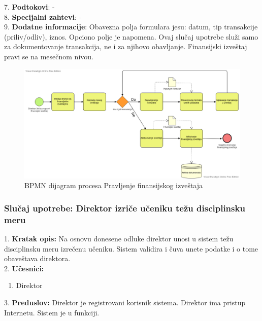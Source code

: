 \documentclass{article}
\begin{document}
7. \textbf{Podtokovi}:  - \\

8. \textbf{Specijalni zahtevi}: - \\

9. \textbf{Dodatne informacije}: Obavezna polja formulara jesu: datum, tip transakcije (priliv/odliv), iznos. Opciono polje je napomena. Ovaj slučaj upotrebe služi samo za dokumentovanje transakcija, ne i za njihovo obavljanje. Finansijski izveštaj pravi se na mesečnom nivou.  \\

\begin{figure} [!ht]
    \begin{center}
        \includegraphics[scale=0.37]{imgs/BPMN_pravljenje_finansijskog_izvestaja.png}
    \end{center}
\caption{BPMN dijagram procesa Pravljenje finansijskog izveštaja}
\end{figure}


\subsubsection{Slučaj upotrebe: Direktor izriče učeniku težu disciplinsku meru}
1. \textbf{Kratak opis:} Na osnovu donesene odluke direktor unosi u sistem težu disciplinsku meru izrečenu učeniku. Sistem validira i čuva unete podatke i o tome obaveštava direktora. \\

2. \textbf{Učesnici:}
\begin{enumerate} [label=(\alph*)]
\item Direktor
\end{enumerate} 

3. \textbf{Preduslov:} Direktor je registrovani korisnik sistema. Direktor ima pristup Internetu. Sistem je u funkciji. \\
\end{document}
